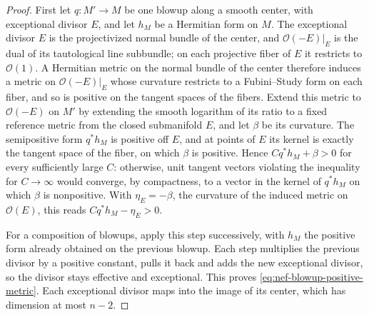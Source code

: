 \begin{proof}
First let $q\colon M'\to M$ be one blowup along a smooth center, with exceptional divisor $E$, and let $h_M$ be a Hermitian form on $M$. The exceptional divisor $E$ is the projectivized normal bundle of the center, and $\mathcal O(-E)|_E$ is the dual of its tautological line subbundle; on each projective fiber of $E$ it restricts to $\mathcal O(1)$. A Hermitian metric on the normal bundle of the center therefore induces a metric on $\mathcal O(-E)|_E$ whose curvature restricts to a Fubini--Study form on each fiber, and so is positive on the tangent spaces of the fibers. Extend this metric to $\mathcal O(-E)$ on $M'$ by extending the smooth logarithm of its ratio to a fixed reference metric from the closed submanifold $E$, and let $\beta$ be its curvature. The semipositive form $q^*h_M$ is positive off $E$, and at points of $E$ its kernel is exactly the tangent space of the fiber, on which $\beta$ is positive. Hence $Cq^*h_M+\beta>0$ for every sufficiently large $C$: otherwise, unit tangent vectors violating the inequality for $C\to\infty$ would converge, by compactness, to a vector in the kernel of $q^*h_M$ on which $\beta$ is nonpositive. With $\eta_E=-\beta$, the curvature of the induced metric on $\mathcal O(E)$, this reads $Cq^*h_M-\eta_E>0$.

For a composition of blowups, apply this step successively, with $h_M$ the positive form already obtained on the previous blowup. Each step multiplies the previous divisor by a positive constant, pulls it back and adds the new exceptional divisor, so the divisor stays effective and exceptional. This proves \eqref{eq:nef-blowup-positive-metric}. Each exceptional divisor maps into the image of its center, which has dimension at most $n-2$.
\end{proof}
